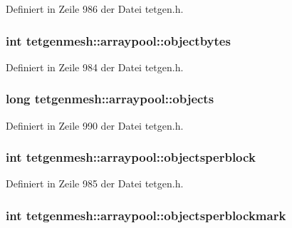 Definiert in Zeile 986 der Datei tetgen.\-h.

\hypertarget{classtetgenmesh_1_1arraypool_a469ac2a2833a25faa0f99ab011122e2d}{
\subsubsection[{objectbytes}]{\setlength{\rightskip}{0pt plus 5cm}int tetgenmesh\-::arraypool\-::objectbytes}}\label{classtetgenmesh_1_1arraypool_a469ac2a2833a25faa0f99ab011122e2d}


Definiert in Zeile 984 der Datei tetgen.\-h.

\hypertarget{classtetgenmesh_1_1arraypool_a23345232309fd68d2e3afa6d017299b0}{
\subsubsection[{objects}]{\setlength{\rightskip}{0pt plus 5cm}long tetgenmesh\-::arraypool\-::objects}}\label{classtetgenmesh_1_1arraypool_a23345232309fd68d2e3afa6d017299b0}


Definiert in Zeile 990 der Datei tetgen.\-h.

\hypertarget{classtetgenmesh_1_1arraypool_a2b6ba46461d5c8f0e6043bdd111246dd}{
\subsubsection[{objectsperblock}]{\setlength{\rightskip}{0pt plus 5cm}int tetgenmesh\-::arraypool\-::objectsperblock}}\label{classtetgenmesh_1_1arraypool_a2b6ba46461d5c8f0e6043bdd111246dd}


Definiert in Zeile 985 der Datei tetgen.\-h.

\hypertarget{classtetgenmesh_1_1arraypool_a662031b2a9978bfc3be39ce90bd3bf0a}{
\subsubsection[{objectsperblockmark}]{\setlength{\rightskip}{0pt plus 5cm}int tetgenmesh\-::arraypool\-::objectsperblockmark}}\label{classtetgenmesh_1_1arraypool_a662031b2a9978bfc3be39ce90bd3bf0a}


